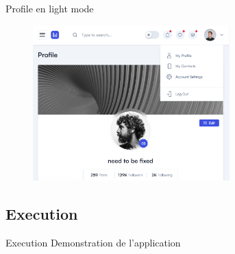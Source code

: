 \begin{frame}{Profile en light mode}
    \begin{figure}[H]
        \centering
        \includegraphics[height=6cm]{assets/images/light-profile.png}
    \end{figure}
\end{frame}

\subsection{Execution}
\begin{frame}{Execution}
    Demonstration de l'application
\end{frame}
